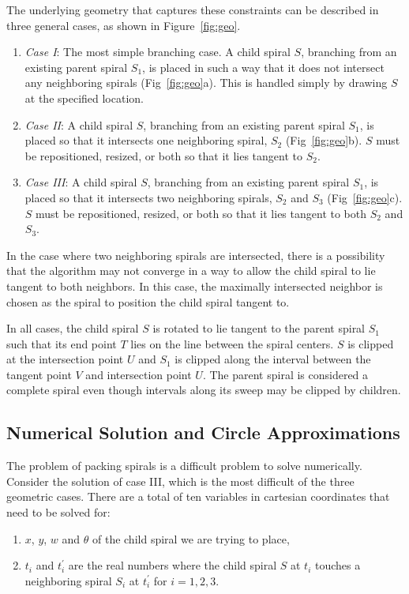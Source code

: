 \documentclass[11pt]{IEEEtran}
\begin{document}
The underlying geometry that captures these constraints can be described in three general cases, as shown in Figure~\ref{fig:geo}. 

\begin{enumerate}
	\item \textit{Case I}: The most simple branching case. A child spiral $S$, branching from an existing parent spiral $S_{1}$, is placed in such a way that it does not intersect any neighboring spirals (Fig~\ref{fig:geo}a). This is handled simply by drawing $S$ at the specified location. 
	
	\item \textit{Case II}: A child spiral $S$, branching from an existing parent spiral $S_{1}$, is placed so that it intersects one neighboring spiral, $S_{2}$ (Fig~\ref{fig:geo}b). $S$ must be repositioned, resized, or both so that it lies tangent to $S_{2}$.
	
	\item \textit{Case III}: A child spiral $S$, branching from an existing parent spiral $S_{1}$, is placed so that it intersects two neighboring spirals, $S_{2}$ and  $S_{3}$ (Fig~\ref{fig:geo}c). $S$ must be repositioned, resized, or both so that it lies tangent to both $S_{2}$ and  $S_{3}$. 
\end{enumerate}

In the case where two neighboring spirals are intersected, there is a possibility that the algorithm may not converge in a way to allow the child spiral to lie tangent to both neighbors. In this case, the maximally intersected neighbor is chosen as the spiral to position the child spiral tangent to.

In all cases, the child spiral $S$ is rotated to lie tangent to the parent spiral $S_{1}$ such that its end point $T$ lies on the line between the spiral centers. $S$ is clipped at the intersection point $U$ and $S_{1}$ is clipped along the interval between the tangent point $V$ and intersection point $U$. The parent spiral is considered a complete spiral even though intervals along its sweep may be clipped by children.

\subsection{Numerical Solution and Circle Approximations}	
The problem of packing spirals is a difficult problem to solve numerically. Consider the solution of case III, which is the most difficult of the three geometric cases. There are a total of ten variables in cartesian coordinates that need to be solved for:
\begin{enumerate}
\item $x$, $y$, $w$ and $\theta$ of the child spiral we are trying to place,
\item $t_{i}$ and $t^{\prime}_{i}$ are the real numbers where the child  spiral $S$ at $t_{i}$ touches a neighboring spiral $S_{i}$ at $t^{\prime}_{i}$ for $i = 1,2,3$.
\end{enumerate}
\end{document}
